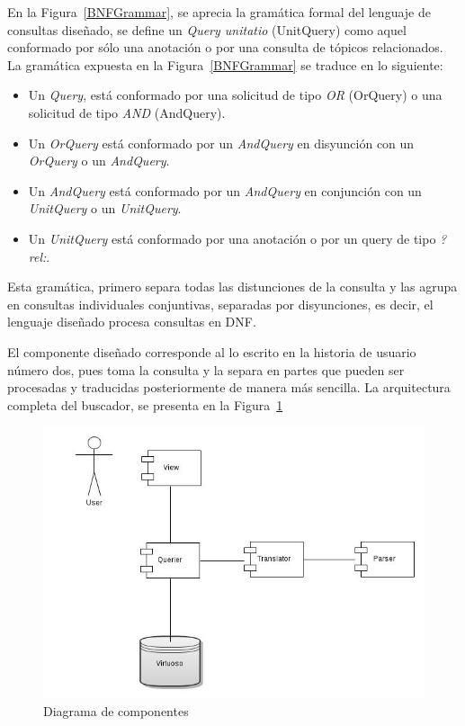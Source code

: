 \begin{itemize}
En la Figura~\ref{BNFGrammar}, se aprecia la gramática formal del lenguaje de consultas diseñado, se define un \textit{Query unitatio} (UnitQuery) como aquel conformado por sólo una anotación o por una consulta de tópicos relacionados. La gramática expuesta en la Figura~\ref{BNFGrammar} se traduce en lo siguiente:

\begin{itemize}
    \item Un \textit{Query}, está conformado por una solicitud de tipo \textit{OR} (OrQuery) o una solicitud de tipo \textit{AND} (AndQuery).
    \item Un \textit{OrQuery} está conformado por un \textit{AndQuery} en disyunción con un \textit{OrQuery} o un \textit{AndQuery}.
    \item Un \textit{AndQuery} está conformado por un \textit{AndQuery} en conjunción con un \textit{UnitQuery} o un \textit{UnitQuery}.
    \item Un \textit{UnitQuery} está conformado por una anotación o por un query de tipo \textit{?rel:}.
\end{itemize}

Esta gramática, primero separa todas las distunciones de la consulta y las agrupa en consultas individuales conjuntivas, separadas por disyunciones, es decir, el lenguaje diseñado procesa consultas en DNF.

El componente diseñado corresponde al lo escrito en la historia de usuario número dos, pues toma la consulta y la separa en partes que pueden ser procesadas y traducidas posteriormente de manera más sencilla. La arquitectura completa del buscador, se presenta en la Figura~\ref{searcher_architecture}

\begin{figure}[!h]
    \begin{center}
        \includegraphics[scale=0.45]{images/searcher_components.jpg}
        \caption{Diagrama de componentes}
        \label{searcher_architecture}
    \end{center}
\end{figure}


\end{itemize}
